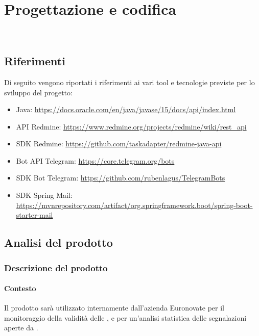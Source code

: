 
\chapter{Progettazione e codifica}
\label{cap:progettazione-codifica}

\\
\section{Riferimenti}
    Di seguito vengono riportati i riferimenti ai vari tool e tecnologie previste per lo sviluppo del progetto:
    \begin{itemize}
        \item Java: \url{https://docs.oracle.com/en/java/javase/15/docs/api/index.html}
        \item API Redmine: \url{https://www.redmine.org/projects/redmine/wiki/rest_api}
        \item SDK Redmine: \url{https://github.com/taskadapter/redmine-java-api}
        \item Bot API Telegram: \url{https://core.telegram.org/bots}
        \item SDK Bot Telegram: \url{https://github.com/rubenlagus/TelegramBots}
        \item SDK Spring Mail: \url{https://mvnrepository.com/artifact/org.springframework.boot/spring-boot-starter-mail}
    \end{itemize}

\section{Analisi del prodotto}
	\subsection{Descrizione del prodotto}
		\subsubsection{Contesto}
			Il prodotto sarà utilizzato internamente dall'azienda Euronovate per il monitoraggio della validità delle , e per un'analisi statistica delle segnalazioni aperte da .
